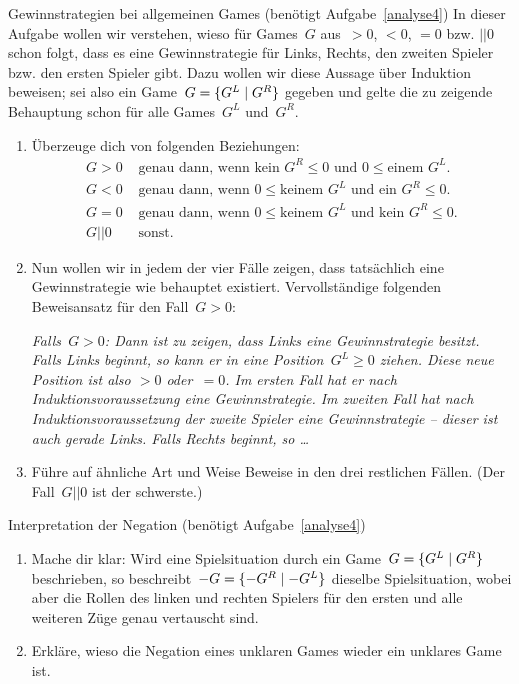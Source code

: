 \documentclass{zirkelblatt}
\newcommand{\fuzzy}{\mathrel{||}}
\begin{document}
\begin{aufgabe}{Gewinnstrategien bei allgemeinen Games (benötigt Aufgabe~\ref{analyse4})}
\label{gewinnstrategien}
In dieser Aufgabe wollen wir verstehen, wieso für Games~$G$ aus~$> 0$, $<
0$, $= 0$ bzw. $\fuzzy 0$ schon folgt, dass es eine Gewinnstrategie für Links,
Rechts, den zweiten Spieler bzw. den ersten Spieler gibt. Dazu wollen wir diese
Aussage über Induktion beweisen; sei also ein Game~$G = \{ G^L \mathrel{|} G^R \}$
gegeben und gelte die zu zeigende Behauptung schon für alle Games~$G^L$
und~$G^R$.
\begin{enumerate}
\item Überzeuge dich von folgenden Beziehungen:
\begin{align*}
  G > 0 &\text{ genau dann, wenn $\text{kein $G^R$} \leq 0$ und~$0 \leq \text{einem $G^L$}$.} \\
  G < 0 &\text{ genau dann, wenn $0 \leq \text{keinem $G^L$}$ und~$\text{ein $G^R$} \leq 0$.} \\
  G = 0 &\text{ genau dann, wenn $0 \leq \text{keinem $G^L$}$ und~$\text{kein $G^R$} \leq 0$.} \\
  G \fuzzy 0 &\text{ sonst.}
\end{align*}
\item Nun wollen wir in jedem der vier Fälle zeigen, dass tatsächlich eine Gewinnstrategie
wie behauptet existiert. Vervollständige folgenden Beweisansatz für den Fall~$G
> 0$:

\emph{Falls~$G > 0$: Dann ist zu zeigen, dass Links eine
Gewinnstrategie besitzt. Falls Links beginnt, so kann er in eine Position~$G^L
\geq 0$ ziehen. Diese neue Position ist also $> 0$ oder~$= 0$. Im ersten Fall
hat er nach Induktionsvoraussetzung eine Gewinnstrategie. Im zweiten Fall hat
nach Induktionsvoraussetzung der zweite Spieler eine Gewinnstrategie -- dieser
ist auch gerade Links. Falls Rechts beginnt, so \ldots}
\item Führe auf ähnliche Art und Weise Beweise in den drei restlichen Fällen.
(Der Fall~$G \fuzzy 0$ ist der schwerste.)
\end{enumerate}
\end{aufgabe}

\begin{aufgabe}{Interpretation der Negation (benötigt Aufgabe~\ref{analyse4})}
\label{game-negation}
\begin{enumerate}
\item Mache dir klar: Wird eine Spielsituation durch ein Game~$G =
\{ G^L \mathrel{|} G^R \}$ beschrieben,
so beschreibt~$-G = \{ -G^R \mathrel{|} -G^L \}$ dieselbe Spielsituation, wobei aber die Rollen des linken und
rechten Spielers für den ersten und alle weiteren Züge genau vertauscht sind.
\item Erkläre, wieso die Negation
eines unklaren Games wieder ein unklares Game ist.
\end{enumerate}
\end{aufgabe}
\end{document}
